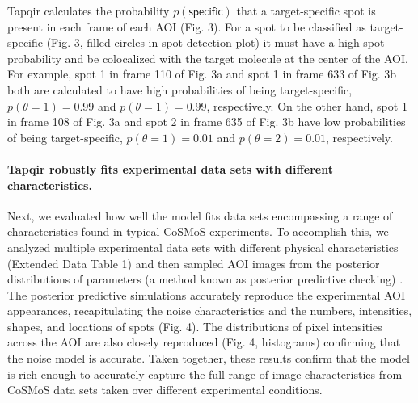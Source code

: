 Tapqir calculates the probability $p(\mathsf{specific})$ that a target-specific spot is present in each frame of each AOI (Fig. 3).  For a spot to be classified as target-specific (Fig. 3, filled circles in spot detection plot) it must have a high spot probability and be colocalized with the target molecule at the center of the AOI. For example, spot 1 in frame 110 of Fig. 3a and spot 1 in frame 633 of Fig. 3b both are calculated to have high probabilities of being target-specific, $p(\theta=1) = 0.99$ and $p(\theta=1) = 0.99$, respectively. On the other hand, spot 1 in frame 108 of Fig. 3a and spot 2 in frame 635 of Fig. 3b have low probabilities of being target-specific, $p(\theta=1) = 0.01$ and $p(\theta=2) = 0.01$, respectively. 


\paragraph{Tapqir robustly fits experimental data sets with different characteristics.}
Next, we evaluated how well the model fits data sets encompassing a range of characteristics found in typical CoSMoS experiments. To accomplish this, we analyzed multiple experimental data sets with different physical characteristics (Extended Data Table 1) and then sampled AOI images from the posterior distributions of parameters (a method known as posterior predictive checking) \cite{Gelman_undated-ro}. The posterior predictive simulations accurately reproduce the experimental AOI appearances, recapitulating the noise characteristics and the numbers, intensities, shapes, and locations of spots (Fig. 4).  The distributions of pixel intensities across the AOI are also closely reproduced (Fig. 4, histograms) confirming that the noise model is accurate. Taken together, these results confirm that the model is rich enough to accurately capture the full range of image characteristics from CoSMoS data sets taken over different experimental conditions.

